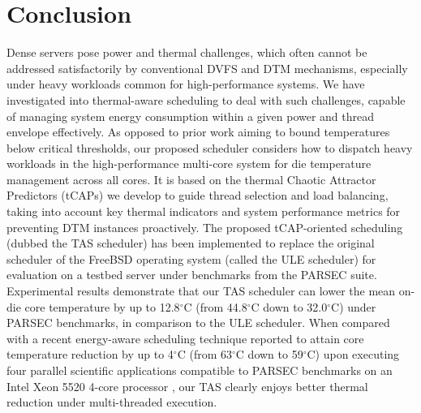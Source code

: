 \documentclass[times, 10pt,twocolumn]{IEEEtran}
\begin{document}
\section{Conclusion}
\label{sec:conclusion}
Dense servers pose power and thermal challenges, which often cannot be
addressed satisfactorily by conventional DVFS and DTM mechanisms,
especially under heavy workloads common for high-performance systems.
We have investigated into thermal-aware scheduling to deal with such
challenges, capable of managing system energy consumption within a given
power and thread envelope effectively.  As opposed to prior work aiming
to bound temperatures below critical thresholds, our proposed scheduler
considers how to dispatch heavy workloads in the high-performance
multi-core system for die temperature management across all cores.  It
is based on the thermal Chaotic Attractor Predictors (tCAPs) we develop
to guide thread selection and load balancing, taking into account key
thermal indicators and system performance metrics for preventing DTM
instances proactively.  The proposed tCAP-oriented scheduling (dubbed
the TAS scheduler) has been implemented to replace the original
scheduler of the FreeBSD operating system (called the ULE scheduler) for
evaluation on a testbed server under benchmarks from the PARSEC suite.
Experimental results demonstrate that our TAS scheduler can lower the
mean on-die core temperature by up to 12.8$^{\circ}$C (from 44.8$^\circ$C
down to 32.0$^\circ$C) under PARSEC benchmarks, in comparison to the ULE
scheduler.  When compared with a recent energy-aware scheduling
technique reported to attain core temperature reduction by up to
4$^\circ$C (from 63$^\circ$C down to 59$^\circ$C) upon executing four
parallel scientific applications compatible to PARSEC benchmarks on an
Intel Xeon 5520 4-core processor \cite{Sarood2011}, our TAS clearly
enjoys better thermal reduction under multi-threaded execution.

\label{sec:references}
\begin{small}


\end{small}
\end{document}
